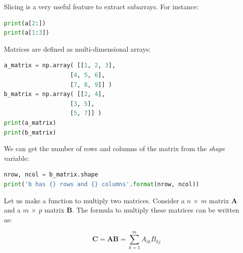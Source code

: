\documentclass[a4paper , 12pt]{book}
\begin{document}
Slicing is a very useful feature to extract subarrays. For instance:

\begin{center}
\begin{lstlisting}[language=Python, frame=single]
print(a[2:])
print(a[1:3])
\end{lstlisting}
\end{center}

Matrices are defined as multi-dimensional arrays:

\begin{center}
\begin{lstlisting}[language=Python, frame=single]
a_matrix = np.array( [[1, 2, 3], 
                   [4, 5, 6], 
                   [7, 8, 9]] )
b_matrix = np.array( [[2, 4],
                   [3, 5],
                   [5, 7]] )
print(a_matrix)
print(b_matrix)
\end{lstlisting}
\end{center}

We can get the number of rows and columns of the matrix from the \textit{shape} variable:

\begin{center}
\begin{lstlisting}[language=Python, frame=single]
nrow, ncol = b_matrix.shape
print('b has {} rows and {} columns'.format(nrow, ncol))
\end{lstlisting}
\end{center}

Let us make a function to multiply two matrices. Consider a $n$ $\times$ $m$ matrix \textbf{A} and a $m$ $\times$ $p$ matrix \textbf{B}. The formula to multiply these matrices can be written as:

\begin{equation}
    \textbf{C} = \textbf{AB} =\sum_{k=1}^m A_{ik}B_{kj}
\end{equation}
\end{document}
